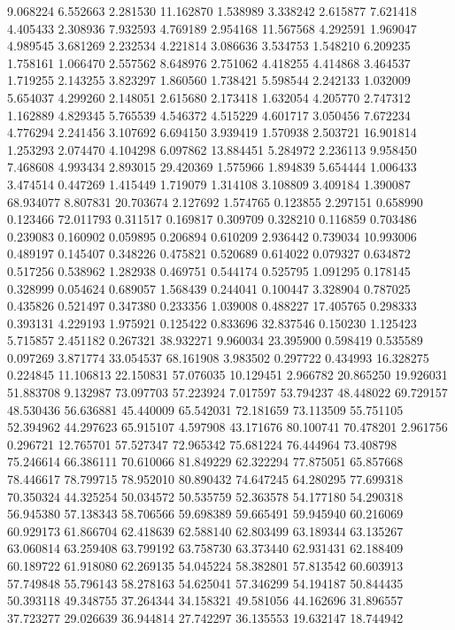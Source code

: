 9.068224
6.552663
2.281530
11.162870
1.538989
3.338242
2.615877
7.621418
4.405433
2.308936
7.932593
4.769189
2.954168
11.567568
4.292591
1.969047
4.989545
3.681269
2.232534
4.221814
3.086636
3.534753
1.548210
6.209235
1.758161
1.066470
2.557562
8.648976
2.751062
4.418255
4.414868
3.464537
1.719255
2.143255
3.823297
1.860560
1.738421
5.598544
2.242133
1.032009
5.654037
4.299260
2.148051
2.615680
2.173418
1.632054
4.205770
2.747312
1.162889
4.829345
5.765539
4.546372
4.515229
4.601717
3.050456
7.672234
4.776294
2.241456
3.107692
6.694150
3.939419
1.570938
2.503721
16.901814
1.253293
2.074470
4.104298
6.097862
13.884451
5.284972
2.236113
9.958450
7.468608
4.993434
2.893015
29.420369
1.575966
1.894839
5.654444
1.006433
3.474514
0.447269
1.415449
1.719079
1.314108
3.108809
3.409184
1.390087
68.934077
8.807831
20.703674
2.127692
1.574765
0.123855
2.297151
0.658990
0.123466
72.011793
0.311517
0.169817
0.309709
0.328210
0.116859
0.703486
0.239083
0.160902
0.059895
0.206894
0.610209
2.936442
0.739034
10.993006
0.489197
0.145407
0.348226
0.475821
0.520689
0.614022
0.079327
0.634872
0.517256
0.538962
1.282938
0.469751
0.544174
0.525795
1.091295
0.178145
0.328999
0.054624
0.689057
1.568439
0.244041
0.100447
3.328904
0.787025
0.435826
0.521497
0.347380
0.233356
1.039008
0.488227
17.405765
0.298333
0.393131
4.229193
1.975921
0.125422
0.833696
32.837546
0.150230
1.125423
5.715857
2.451182
0.267321
38.932271
9.960034
23.395900
0.598419
0.535589
0.097269
3.871774
33.054537
68.161908
3.983502
0.297722
0.434993
16.328275
0.224845
11.106813
22.150831
57.076035
10.129451
2.966782
20.865250
19.926031
51.883708
9.132987
73.097703
57.223924
7.017597
53.794237
48.448022
69.729157
48.530436
56.636881
45.440009
65.542031
72.181659
73.113509
55.751105
52.394962
44.297623
65.915107
4.597908
43.171676
80.100741
70.478201
2.961756
0.296721
12.765701
57.527347
72.965342
75.681224
76.444964
73.408798
75.246614
66.386111
70.610066
81.849229
62.322294
77.875051
65.857668
78.446617
78.799715
78.952010
80.890432
74.647245
64.280295
77.699318
70.350324
44.325254
50.034572
50.535759
52.363578
54.177180
54.290318
56.945380
57.138343
58.706566
59.698389
59.665491
59.945940
60.216069
60.929173
61.866704
62.418639
62.588140
62.803499
63.189344
63.135267
63.060814
63.259408
63.799192
63.758730
63.373440
62.931431
62.188409
60.189722
61.918080
62.269135
54.045224
58.382801
57.813542
60.603913
57.749848
55.796143
58.278163
54.625041
57.346299
54.194187
50.844435
50.393118
49.348755
37.264344
34.158321
49.581056
44.162696
31.896557
37.723277
29.026639
36.944814
27.742297
36.135553
19.632147
18.744942
